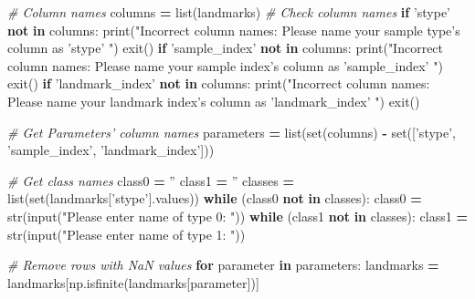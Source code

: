 \documentclass[10pt,letterpaper]{article}
\newenvironment{Shaded}{\begin{snugshade}}{\end{snugshade}}
\newcommand{\KeywordTok}[1]{\textcolor[rgb]{0.13,0.29,0.53}{\textbf{#1}}}
\newcommand{\StringTok}[1]{\textcolor[rgb]{0.31,0.60,0.02}{#1}}
\newcommand{\CommentTok}[1]{\textcolor[rgb]{0.56,0.35,0.01}{\textit{#1}}}
\newcommand{\ControlFlowTok}[1]{\textcolor[rgb]{0.13,0.29,0.53}{\textbf{#1}}}
\newcommand{\OperatorTok}[1]{\textcolor[rgb]{0.81,0.36,0.00}{\textbf{#1}}}
\newcommand{\BuiltInTok}[1]{#1}
\newcommand{\NormalTok}[1]{#1}
\begin{document}
\begin{Shaded}
\begin{Highlighting}[]
    \CommentTok{# Column names}
\NormalTok{    columns }\OperatorTok{=} \BuiltInTok{list}\NormalTok{(landmarks)}
    \CommentTok{# Check column names}
    \ControlFlowTok{if} \StringTok{'stype'} \KeywordTok{not} \KeywordTok{in}\NormalTok{ columns:}
        \BuiltInTok{print}\NormalTok{(}\StringTok{"Incorrect column names: Please}
\StringTok{            name your sample type's column as 'stype' "}\NormalTok{)}
\NormalTok{        exit()}
    \ControlFlowTok{if} \StringTok{'sample_index'} \KeywordTok{not} \KeywordTok{in}\NormalTok{ columns:}
        \BuiltInTok{print}\NormalTok{(}\StringTok{"Incorrect column names: Please name your}
\StringTok{            sample index's column as 'sample_index' "}\NormalTok{)}
\NormalTok{        exit()}
    \ControlFlowTok{if} \StringTok{'landmark_index'} \KeywordTok{not} \KeywordTok{in}\NormalTok{ columns:}
        \BuiltInTok{print}\NormalTok{(}\StringTok{"Incorrect column names: Please name your}
\StringTok{            landmark index's column as 'landmark_index' "}\NormalTok{)}
\NormalTok{        exit()}

    \CommentTok{# Get Parameters' column names}
\NormalTok{    parameters }\OperatorTok{=} \BuiltInTok{list}\NormalTok{(}\BuiltInTok{set}\NormalTok{(columns) }\OperatorTok{-}
        \BuiltInTok{set}\NormalTok{([}\StringTok{'stype'}\NormalTok{, }\StringTok{'sample_index'}\NormalTok{, }\StringTok{'landmark_index'}\NormalTok{]))}

    \CommentTok{# Get class names}
\NormalTok{    class0 }\OperatorTok{=} \StringTok{''}
\NormalTok{    class1 }\OperatorTok{=} \StringTok{''}
\NormalTok{    classes }\OperatorTok{=} \BuiltInTok{list}\NormalTok{(}\BuiltInTok{set}\NormalTok{(landmarks[}\StringTok{'stype'}\NormalTok{].values))}
    \ControlFlowTok{while}\NormalTok{ (class0 }\KeywordTok{not} \KeywordTok{in}\NormalTok{ classes):}
\NormalTok{        class0 }\OperatorTok{=} \BuiltInTok{str}\NormalTok{(}\BuiltInTok{input}\NormalTok{(}\StringTok{"Please enter name of type 0: "}\NormalTok{))}
    \ControlFlowTok{while}\NormalTok{ (class1 }\KeywordTok{not} \KeywordTok{in}\NormalTok{ classes):}
\NormalTok{        class1 }\OperatorTok{=} \BuiltInTok{str}\NormalTok{(}\BuiltInTok{input}\NormalTok{(}\StringTok{"Please enter name of type 1: "}\NormalTok{))}

    \CommentTok{# Remove rows with NaN values}
    \ControlFlowTok{for}\NormalTok{ parameter }\KeywordTok{in}\NormalTok{ parameters:}
\NormalTok{        landmarks }\OperatorTok{=}\NormalTok{ landmarks[np.isfinite(landmarks[parameter])]}


\end{Highlighting}
\end{Shaded}
\end{document}
